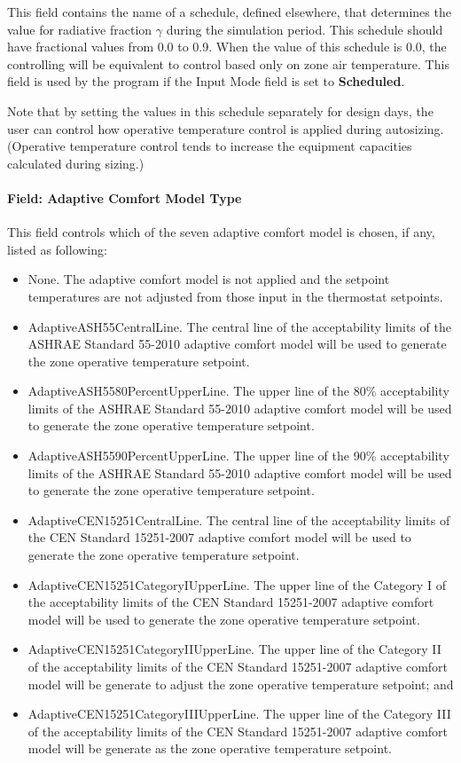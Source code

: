 This field contains the name of a schedule, defined elsewhere, that determines the value for radiative fraction \(\gamma\) during the simulation period. This schedule should have fractional values from 0.0 to 0.9. When the value of this schedule is 0.0, the controlling will be equivalent to control based only on zone air temperature. This field is used by the program if the Input Mode field is set to \textbf{Scheduled}.

Note that by setting the values in this schedule separately for design days, the user can control how operative temperature control is applied during autosizing. (Operative temperature control tends to increase the equipment capacities calculated during sizing.)

\paragraph{Field: Adaptive Comfort Model Type}\label{field-adaptive-comfort-mode-type}

This field controls which of the seven adaptive comfort model is chosen, if any, listed as following:
\begin{itemize}
\tightlist
\item None. The adaptive comfort model is not applied and the setpoint temperatures are not adjusted from those input in the thermostat setpoints.
\item AdaptiveASH55CentralLine. The central line of the acceptability limits of the ASHRAE Standard 55-2010 adaptive comfort model will be used to generate the zone operative temperature setpoint.
\item AdaptiveASH5580PercentUpperLine. The upper line of the 80\% acceptability limits of the ASHRAE Standard 55-2010 adaptive comfort model will be used to generate the zone operative temperature setpoint.
\item AdaptiveASH5590PercentUpperLine. The upper line of the 90\% acceptability limits of the ASHRAE Standard 55-2010 adaptive comfort model will be used to generate the zone operative temperature setpoint.
\item AdaptiveCEN15251CentralLine. The central line of the acceptability limits of the CEN Standard 15251-2007 adaptive comfort model will be used to generate the zone operative temperature setpoint.
\item AdaptiveCEN15251CategoryIUpperLine. The upper line of the Category I of the acceptability limits of the CEN Standard 15251-2007 adaptive comfort model will be used to generate the zone operative temperature setpoint.
\item AdaptiveCEN15251CategoryIIUpperLine. The upper line of the Category II of the acceptability limits of the CEN Standard 15251-2007 adaptive comfort model will be generate to adjust the zone operative temperature setpoint; and
\item AdaptiveCEN15251CategoryIIIUpperLine. The upper line of the Category III of the acceptability limits of the CEN Standard 15251-2007 adaptive comfort model will be generate as the zone operative temperature setpoint.
\end{itemize}

